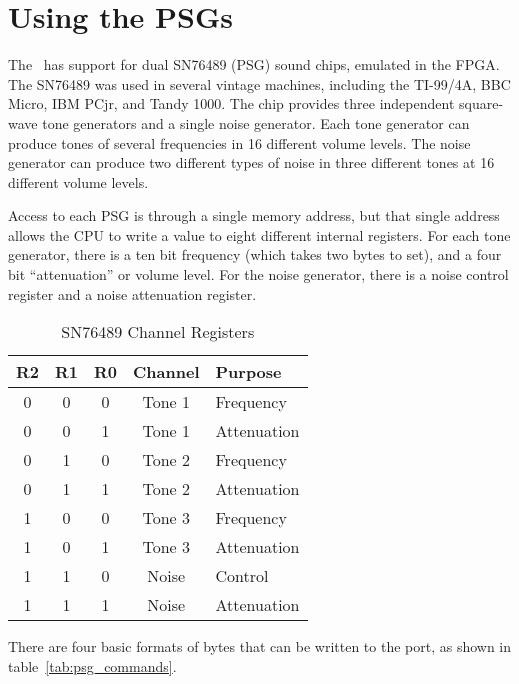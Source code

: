 \section*{Using the PSGs}

The \jr\ has support for dual SN76489 (PSG) sound chips, emulated in the FPGA. The SN76489 was used in several vintage machines, including the TI-99/4A, BBC Micro, IBM PCjr, and Tandy 1000. The chip provides three independent square-wave tone generators and a single noise generator. Each tone generator can produce tones of several frequencies in 16 different volume levels. The noise generator can produce two different types of noise in three different tones at 16 different volume levels.

Access to each PSG is through a single memory address, but that single address allows the CPU to write a value to eight different internal registers. For each tone generator, there is a ten bit frequency (which takes two bytes to set), and a four bit ``attenuation'' or volume level. For the noise generator, there is a noise control register and a noise attenuation register.

\begin{table}[ht]
	\begin{center}
		\begin{tabular}{|c|c|c|c|l|} \hline
			R2 & R1 & R0 & Channel & Purpose \\ \hline \hline
			0 & 0 & 0 & Tone 1 & Frequency \\ \hline
			0 & 0 & 1 & Tone 1 & Attenuation \\ \hline
			0 & 1 & 0 & Tone 2 & Frequency \\ \hline
			0 & 1 & 1 & Tone 2 & Attenuation \\ \hline
			1 & 0 & 0 & Tone 3 & Frequency \\ \hline
			1 & 0 & 1 & Tone 3 & Attenuation \\ \hline
			1 & 1 & 0 & Noise & Control \\ \hline
			1 & 1 & 1 & Noise & Attenuation \\ \hline
		\end{tabular}
	\end{center}
	\caption{SN76489 Channel Registers}
	\label{tab:psg_registers}
\end{table}

There are four basic formats of bytes that can be written to the port, as shown in table~\ref{tab:psg_commands}.

